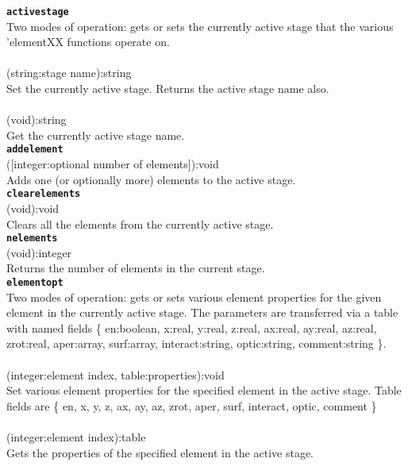 \documentclass{article}
\begin{document}
{\large \texttt{\textbf{activestage}}}\\
Two modes of operation: gets or sets the currently active stage that the various 'elementXX functions operate on.\\\\
\textsf{ (string:stage name):string }\\
Set the currently active stage.  Returns the active stage name also.\\
\\\textsf{ (void):string }\\
Get the currently active stage name.\\

{\large \texttt{\textbf{addelement}}}\\
\textsf{ ([integer:optional number of elements]):void }\\
Adds one (or optionally more) elements to the active stage.\\

{\large \texttt{\textbf{clearelements}}}\\
\textsf{ (void):void }\\
Clears all the elements from the currently active stage.\\

{\large \texttt{\textbf{nelements}}}\\
\textsf{ (void):integer }\\
Returns the number of elements in the current stage.\\

{\large \texttt{\textbf{elementopt}}}\\
Two modes of operation: gets or sets various element properties for the given element in the currently active stage.  The parameters are transferred via a table with named fields \{ en:boolean, x:real, y:real, z:real, ax:real, ay:real, az:real, zrot:real, aper:array, surf:array, interact:string, optic:string, comment:string \}.\\\\
\textsf{ (integer:element index, table:properties):void }\\
Set various element properties for the specified element in the active stage. Table fields are \{ en, x, y, z, ax, ay, az, zrot, aper, surf, interact, optic, comment \}\\
\\\textsf{ (integer:element index):table }\\
Gets the properties of the specified element in the active stage.\\
\end{document}
